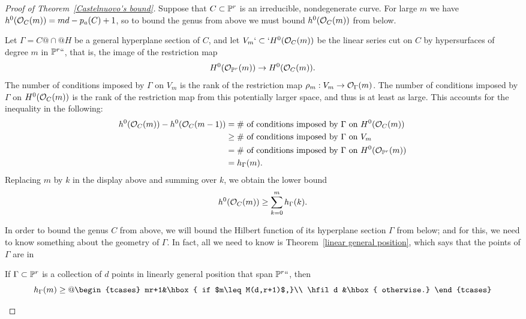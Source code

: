 \begin{proof}[Proof of Theorem~\ref{Castelnuovo's bound}]
Suppose that $C \subset \mathbb P^r$ is an irreducible, nondegenerate curve. For
large $m$ we have
$h^{0}({\mathcal O}_{C}(m)) = md-p_{a}(C) +1$, so to bound the genus from above
we must
bound $h^{0}({\mathcal O}_{C}(m))$ from below.

Let $\Gamma = C@\cap@H$ be a general hyperplane section of $C$, and
let $V_m`\subset`H^0({\mathcal O}_C(m))$ be the linear series cut on $C$ by
hypersurfaces of degree $m$ in $\mathbb P^r` `$, that is, the image of the
restriction map
$$
H^0({\mathcal O}_{\mathbb P^r}(m)) \to H^0({\mathcal O}_C(m)).
$$
The number of  conditions imposed by $\Gamma$ on $V_m$ is the rank of
the restriction map
$\rho_m: V_m \to {\mathcal O}_\Gamma(m)$.
 The number of conditions imposed by $\Gamma$ on $H^{0}({\mathcal O}_{C}(m))$
 is the
 rank of the restriction map from this potentially larger space, and
 thus is at least as large. This
 accounts for the inequality in the following:
{\advance\jot-2pt
\begin{align*}
h^0({\mathcal O}_C(m)) - h^0({\mathcal O}_C(m-1)) & = \text{\# of conditions imposed by
$\Gamma$ on $H^0({\mathcal O}_C(m))$}\\
&\geq \text{\# of conditions imposed by $\Gamma$ on $V_m$} \\
&= \text{\# of conditions imposed by $\Gamma$ on $H^0({\mathcal O}_{\mathbb P^r}(m))$} \\
&= h_\Gamma(m).
\end{align*}}%
Replacing $m$ by $k$ in the display above and summing %
over $k$, we obtain the lower bound
$$
h^0({\mathcal O}_C(m)) \geq \sum_{k=0}^m h_\Gamma(k).
$$

In order to bound the genus $C$ from above, we will bound the Hilbert
function of its hyperplane section $\Gamma$  from below; and for this,
we need to know something about the geometry of $\Gamma$. In fact, all
we need to know is Theorem~\ref{linear general position}, which says
that the points of $\Gamma$ are in 
%

\begin{proposition}\label{min hilb}
If $\Gamma \subset \mathbb P^r$ is a collection of $d$ points in linearly
general position that span $\mathbb P^r` `$, then
$$
h_\Gamma(m) \geq
@
\begin{tcases}
mr+1&\hbox{ if $m\leq M(d,r+1)$,}\\
\hfil d &\hbox{ otherwise.}
\end{tcases}
$$
\end{proposition}


\end{proof}
